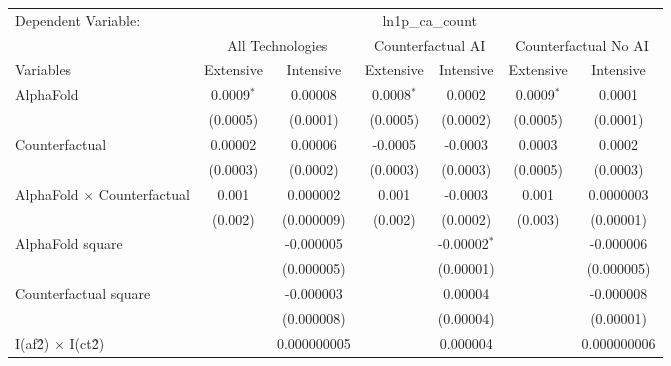 \begingroup
\centering
\begin{tabular}{lcccccc}
   \tabularnewline \midrule \midrule
   Dependent Variable: & \multicolumn{6}{c}{ln1p\_ca\_count}\\
 & \multicolumn{2}{c}{All Technologies} & \multicolumn{2}{c}{Counterfactual AI} & \multicolumn{2}{c}{Counterfactual No AI} \\
\cmidrule(lr){1-1}\cmidrule(lr){2-3} \cmidrule(lr){4-5} \cmidrule(lr){6-7}
Variables & \multicolumn{1}{c}{Extensive} & \multicolumn{1}{c}{Intensive} & \multicolumn{1}{c}{Extensive} & \multicolumn{1}{c}{Intensive} & \multicolumn{1}{c}{Extensive} & \multicolumn{1}{c}{Intensive} \\
\cmidrule(lr){1-1}\cmidrule(lr){2-2} \cmidrule(lr){3-3} \cmidrule(lr){4-4} \cmidrule(lr){5-5} \cmidrule(lr){6-6} \cmidrule(lr){7-7}
   AlphaFold                          & 0.0009$^{*}$ & 0.00008       & 0.0008$^{*}$ & 0.0002         & 0.0009$^{*}$ & 0.0001\\   
                                      & (0.0005)     & (0.0001)      & (0.0005)     & (0.0002)       & (0.0005)     & (0.0001)\\   
   Counterfactual                     & 0.00002      & 0.00006       & -0.0005      & -0.0003        & 0.0003       & 0.0002\\   
                                      & (0.0003)     & (0.0002)      & (0.0003)     & (0.0003)       & (0.0005)     & (0.0003)\\   
   AlphaFold $\times$ Counterfactual  & 0.001        & 0.000002      & 0.001        & -0.0003        & 0.001        & 0.0000003\\   
                                      & (0.002)      & (0.000009)    & (0.002)      & (0.0002)       & (0.003)      & (0.00001)\\   
   AlphaFold square                   &              & -0.000005     &              & -0.00002$^{*}$ &              & -0.000006\\   
                                      &              & (0.000005)    &              & (0.00001)      &              & (0.000005)\\   
   Counterfactual square              &              & -0.000003     &              & 0.00004        &              & -0.000008\\   
                                      &              & (0.000008)    &              & (0.00004)      &              & (0.00001)\\   
   I(af\^2) $\times$ I(ct\^2)         &              & 0.000000005   &              & 0.000004       &              & 0.000000006\\   

\end{tabular}
